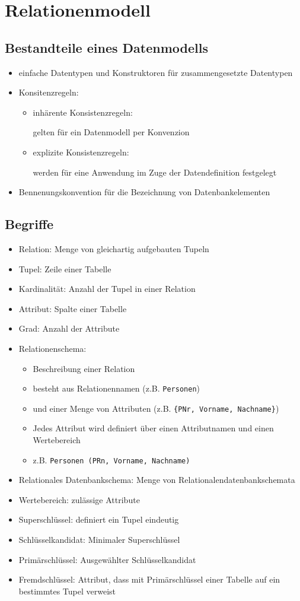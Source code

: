 \section{Relationenmodell}
\subsection{Bestandteile eines Datenmodells}
\begin{itemize}
	\item einfache Datentypen und Konstruktoren für zusammengesetzte Datentypen
	\item Konsitenzregeln:
		\begin{itemize}
			\item inhärente Konsistenzregeln:
					
					gelten für ein Datenmodell per Konvenzion
			\item explizite Konsistenzregeln:
					
					werden für eine Anwendung im Zuge der Datendefinition festgelegt 
		\end{itemize}
	\item Bennenungskonvention für die Bezeichnung von Datenbankelementen
\end{itemize}

\subsection{Begriffe}
\begin{itemize}
	\item Relation: Menge von gleichartig aufgebauten Tupeln
	\item Tupel: Zeile einer Tabelle
	\item Kardinalität: Anzahl der Tupel in einer Relation
	\item Attribut: Spalte einer Tabelle
	\item Grad: Anzahl der Attribute
	\item Relationenschema: 
			\begin{itemize}
				\item Beschreibung einer Relation
				\item besteht aus Relationennamen (z.B. \verb|Personen|)
				\item und einer Menge von Attributen (z.B. \verb|{PNr, Vorname, Nachname}|)
				\item Jedes Attribut wird definiert über einen Attributnamen und einen Wertebereich
				\item z.B. \verb|Personen (PRn, Vorname, Nachname)| 
			\end{itemize}
	\item Relationales Datenbankschema: Menge von Relationalendatenbankschemata
	\item Wertebereich: zulässige Attribute
	\item Superschlüssel: definiert ein Tupel eindeutig
	\item Schlüsselkandidat: Minimaler Superschlüssel
	\item Primärschlüssel: Ausgewählter Schlüsselkandidat
	\item Fremdschlüssel: Attribut, dass mit Primärschlüssel einer Tabelle auf ein bestimmtes Tupel verweist
\end{itemize}
